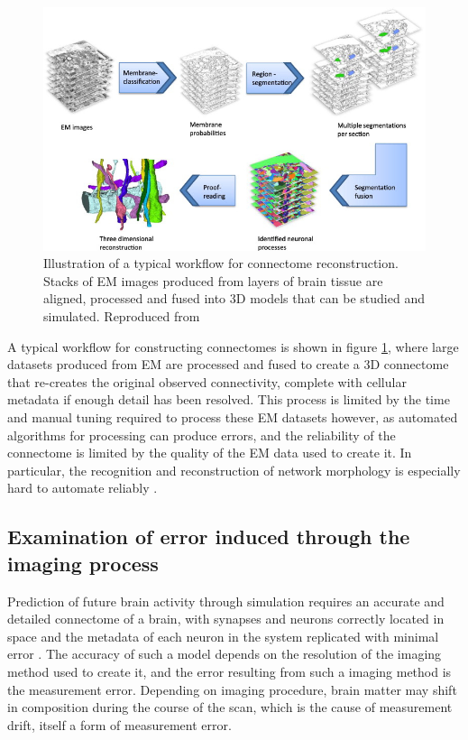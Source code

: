 \begin{figure}[h!]
    \centering
    \includegraphics[scale=0.9]{figures/images/reconstruction.jpg}
    \caption[Illustration of a typical workflow for connectome reconstruction]
        {Illustration of a typical workflow for connectome reconstruction.
        Stacks of EM images produced from layers of brain tissue are aligned,
        processed and fused into 3D models that can be studied and simulated.
        Reproduced from \cite{kaynig_large-scale_2015}}
    \label{reconstruction}
\end{figure}

A typical workflow for constructing
connectomes is shown in figure \ref{reconstruction}, where large datasets
produced from EM are processed and fused to create a 3D connectome that
re-creates the original observed connectivity, complete with cellular metadata
if enough detail has been resolved. This process is limited by the time and
manual tuning required to process these EM datasets however, as automated
algorithms for processing can produce errors, and the reliability of the
connectome is limited by the quality of the EM data used to create it. 
\autocite{pallotto_extracellular_2015} In
particular, the recognition and reconstruction of network morphology is
especially hard to automate reliably \autocite{helmstaedter_connectomic_2013}.

\subsection{Examination of error induced through the imaging process}

Prediction of future brain activity through simulation requires an accurate and
detailed connectome of a brain, with synapses and neurons correctly located in
space and the metadata of each neuron in the system replicated with minimal
error \autocite{bostrom_whole_2008}. The accuracy of such a model depends on the
resolution of the imaging method used to create it, and the error resulting from
such a imaging method is the measurement error. Depending on imaging procedure, brain matter may shift in composition during the course of the scan, which is the cause of measurement drift, itself a form of measurement error.

